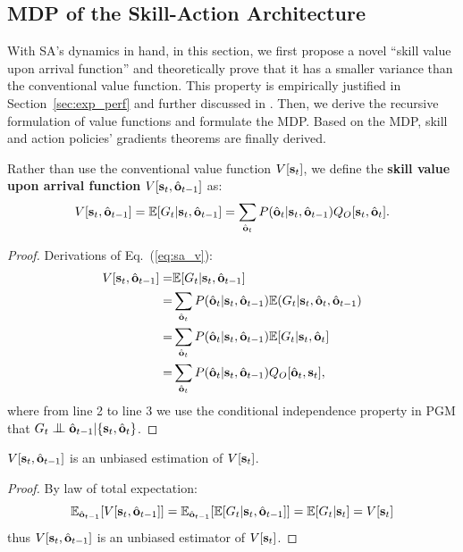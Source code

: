 \subsection{MDP of the Skill-Action Architecture}
\label{sec:sa_mdp}

With SA's dynamics in hand, in this section, we first propose a
novel ``skill value upon arrival function'' and theoretically
prove that it has a smaller variance than the conventional value
function. This property is empirically justified in
Section~\ref{sec:exp_perf} and further discussed in
. Then, we derive the recursive
formulation of value functions and formulate the MDP. Based on
the MDP, skill and action policies' gradients theorems are
finally derived.

Rather than use the conventional value function $V[{\mathbf{s}}_t]$, we
define the \textbf{skill value upon arrival function}
$V[{\mathbf{s}}_t,\hat{{\mathbf{o}}}_{t-1}]$ as:
\begin{equation}
  \label{eq:sa_v}
  V[{\mathbf{s}}_t,\hat{{\mathbf{o}}}_{t-1}]=\mathbb{E}[G_t|{\mathbf{s}}_t,\hat{{\mathbf{o}}}_{t-1}]= \sum_{\hat{{\mathbf{o}}}_t}P(\hat{{\mathbf{o}}}_t|{\mathbf{s}}_t,\hat{{\mathbf{o}}}_{t-1})Q_O[ {\mathbf{s}}_t,\hat{{\mathbf{o}}}_t].
\end{equation}

\begin{proof}
  Derivations of Eq.~(\ref{eq:sa_v}):
%
\begin{align*}
  V[{\mathbf{s}}_t,\hat{{\mathbf{o}}}_{t-1}]=&\mathbb{E}[G_t|{\mathbf{s}}_t,\hat{{\mathbf{o}}}_{t-1}]\\
  =& \sum_{\hat{{\mathbf{o}}}_t}P(\hat{{\mathbf{o}}}_t|{\mathbf{s}}_t,\hat{{\mathbf{o}}}_{t-1})\mathbb{E}(G_t|{\mathbf{s}}_t,\hat{{\mathbf{o}}}_t,\hat{{\mathbf{o}}}_{t-1})\\
  =& \sum_{\hat{{\mathbf{o}}}_t}P(\hat{{\mathbf{o}}}_t|{\mathbf{s}}_t,\hat{{\mathbf{o}}}_{t-1})\mathbb{E}[ G_t|{\mathbf{s}}_t,\hat{{\mathbf{o}}}_t ]\\
  =& \sum_{\hat{{\mathbf{o}}}_t}P(\hat{{\mathbf{o}}}_t|{\mathbf{s}}_t,\hat{{\mathbf{o}}}_{t-1})Q_O[ \hat{{\mathbf{o}}}_t,{\mathbf{s}}_t],
\end{align*}
%
where from line 2 to line 3 we use the conditional independence
property in PGM that
$G_t\bigCI\hat{\rvo}_{t-1}|\{\rvs_t,\hat{\rvo}_t\}$.
\end{proof}

\begin{prop}
  \label{prop:var_unb}
  $V[ {\mathbf{s}}_t,\hat{{\mathbf{o}}}_{t-1} ]$ is an unbiased estimation of $V[ {\mathbf{s}}_t ]$.
\end{prop}
\begin{proof}
  By law of total expectation:
  $$\mathbb{E}_{\hat{{\mathbf{o}}}_{t-1}}[V[{\mathbf{s}}_t,\hat{{\mathbf{o}}}_{t-1}]]=\mathbb{E}_{\hat{{\mathbf{o}}}_{t-1}}[\mathbb{E}[G_t|{\mathbf{s}}_t,\hat{{\mathbf{o}}}_{t-1}]]=\mathbb{E}[G_t|{\mathbf{s}}_t] = V[{\mathbf{s}}_t]$$
%
thus $V[{\mathbf{s}}_t,\hat{{\mathbf{o}}}_{t-1}]$ is an unbiased estimator of $V[{\mathbf{s}}_t]$.
\end{proof}

